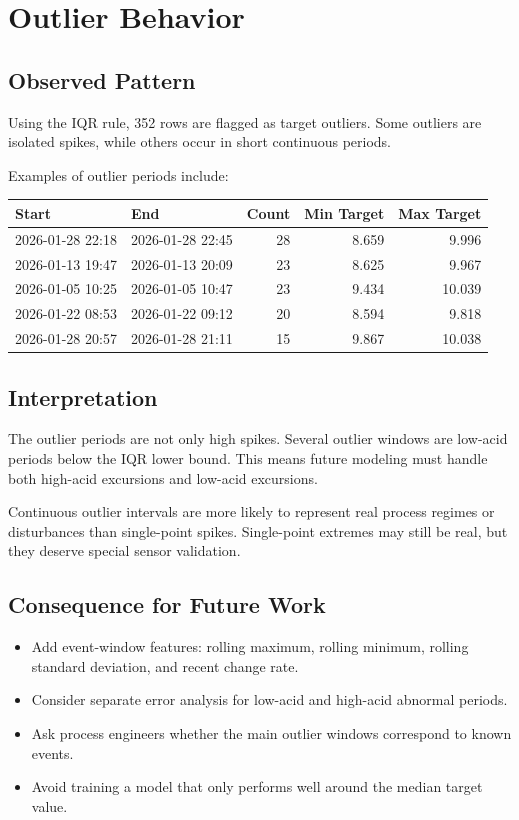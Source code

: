 \documentclass[11pt,a4paper]{article}
\begin{document}
\section{Outlier Behavior}

\subsection{Observed Pattern}

Using the IQR rule, 352 rows are flagged as target outliers. Some outliers are isolated spikes, while others occur in short continuous periods.

Examples of outlier periods include:

\begin{longtable}{p{4cm}p{4cm}rrr}
\toprule
Start & End & Count & Min Target & Max Target \\
\midrule
2026-01-28 22:18 & 2026-01-28 22:45 & 28 & 8.659 & 9.996 \\
2026-01-13 19:47 & 2026-01-13 20:09 & 23 & 8.625 & 9.967 \\
2026-01-05 10:25 & 2026-01-05 10:47 & 23 & 9.434 & 10.039 \\
2026-01-22 08:53 & 2026-01-22 09:12 & 20 & 8.594 & 9.818 \\
2026-01-28 20:57 & 2026-01-28 21:11 & 15 & 9.867 & 10.038 \\
\bottomrule
\end{longtable}

\subsection{Interpretation}

The outlier periods are not only high spikes. Several outlier windows are low-acid periods below the IQR lower bound. This means future modeling must handle both high-acid excursions and low-acid excursions.

Continuous outlier intervals are more likely to represent real process regimes or disturbances than single-point spikes. Single-point extremes may still be real, but they deserve special sensor validation.

\subsection{Consequence for Future Work}

\begin{itemize}
    \item Add event-window features: rolling maximum, rolling minimum, rolling standard deviation, and recent change rate.
    \item Consider separate error analysis for low-acid and high-acid abnormal periods.
    \item Ask process engineers whether the main outlier windows correspond to known events.
    \item Avoid training a model that only performs well around the median target value.
\end{itemize}
\end{document}
